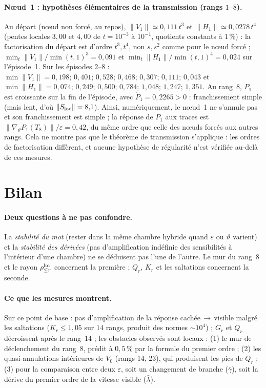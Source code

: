 \documentclass[11pt,a4paper]{article}
\theoremstyle{remark}
\newcommand{\vth}{\vartheta}
\begin{document}
\paragraph{N\oe ud~1 : hypoth\`eses \'el\'ementaires de la transmission (rangs $1$--$8$).} Au d\'epart (n\oe ud non forc\'e, au repos), $\lVert V_1\rVert\simeq0{,}111\,t^3$ et $\lVert H_1\rVert\simeq0{,}0278\,t^4$ (pentes locales $3{,}00$ et $4{,}00$ de $t=10^{-3}$ \`a $10^{-1}$, quotients constants \`a $1\,\%$) : la factorisation du d\'epart est d'ordre $t^3,t^4$, non $s,s^2$ comme pour le n\oe ud forc\'e ; $\min_t\lVert V_1\rVert/\min(t,1)^3=0{,}091$ et $\min_t\lVert H_1\rVert/\min(t,1)^4=0{,}024$ sur l'\'episode~1. Sur les \'episodes $2$--$8$ : $\min\lVert V_1\rVert=0{,}198;\,0{,}401;\,0{,}528;\,0{,}468;\,0{,}307;\,0{,}111;\,0{,}043$ et $\min\lVert H_1\rVert=0{,}074;\,0{,}249;\,0{,}500;\,0{,}784;\,1{,}048;\,1{,}247;\,1{,}351$. Au rang~8, $P_1$ est croissante sur la fin de l'\'episode, avec $\dot P_1=0{,}2265>0$ : franchissement simple (mais lent, d'o\`u $\lVert S_{\rm loc}\rVert=8{,}1$). Ainsi, num\'eriquement, le n\oe ud~1 ne s'annule pas et son franchissement est simple ; la r\'eponse de $P_1$ aux traces est $\lVert\nabla_\vth P_1(T_8)\rVert/\varepsilon=0{,}42$, du m\^eme ordre que celle des n\oe uds forc\'es aux autres rangs. Cela ne montre pas que le th\'eor\`eme de transmission s'applique : les ordres de factorisation diff\`erent, et aucune hypoth\`ese de r\'egularit\'e n'est v\'erifi\'ee au-del\`a de ces mesures.

\section{Bilan}
\paragraph{Deux questions \`a ne pas confondre.} La \emph{stabilit\'e du mot} (rester dans la m\^eme chambre hybride quand $\varepsilon$ ou $\vth$ varient) et la \emph{stabilit\'e des d\'eriv\'ees} (pas d'amplification ind\'efinie des sensibilit\'es \`a l'int\'erieur d'une chambre) ne se d\'eduisent pas l'une de l'autre. Le mur du rang~8 et le rayon $\rho_{\le r}^{\rm lin}$ concernent la premi\`ere ; $Q_r$, $K_r$ et les saltations concernent la seconde.

\paragraph{Ce que les mesures montrent.} Sur ce point de base : pas d'amplification de la r\'eponse cach\'ee\,$\to$\,visible malgr\'e les saltations ($K_r\le1{,}05$ sur $14$ rangs, produit des normes $\sim10^4$) ; $G_r$ et $Q_r$ d\'ecroissent apr\`es le rang~14 ; les obstacles observ\'es sont locaux : (1) le mur de d\'eclenchement du rang~8, pr\'edit \`a $0{,}5\,\%$ par la formule du premier ordre ; (2) les quasi-annulations int\'erieures de $V_0$ (rangs 14, 23), qui produisent les pics de $Q_r$ ; (3) pour la comparaison entre deux $\varepsilon$, soit un changement de branche ($\bar\gamma$), soit la d\'erive du premier ordre de la vitesse visible ($\bar\lambda$).
\end{document}
